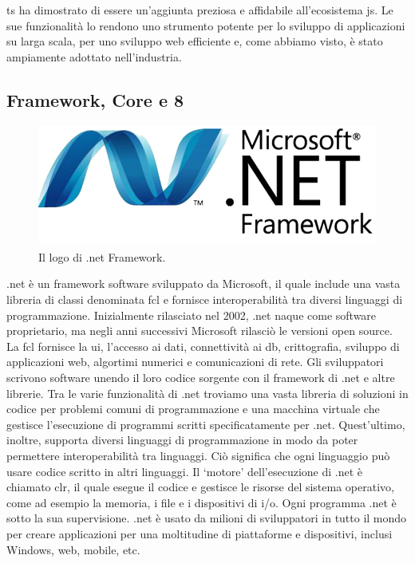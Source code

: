 \acrfull{ts} ha dimostrato di essere un'aggiunta preziosa e affidabile all'ecosistema \acrlong{js}. Le sue funzionalità lo rendono uno strumento potente per lo sviluppo di applicazioni su larga scala, per uno sviluppo web efficiente e, come abbiamo visto, è stato ampiamente adottato nell'industria.


\newpage
\subsection{ Framework,  Core e  8}\label{sec:.net} 
\begin{figure}[H]
\centering
\includegraphics[width=.7\textwidth]{Images/net.png}
\caption{\label{fig:.net}Il logo di \gls{.net} Framework.}
\end{figure}
\gls{.net} è un \gls{framework} \gls{software} sviluppato da Microsoft, il quale include una vasta libreria di classi denominata \acrfull{fcl} e fornisce interoperabilità tra diversi linguaggi di programmazione.
Inizialmente rilasciato nel 2002, \gls{.net} naque come software proprietario, ma negli anni successivi Microsoft rilasciò le versioni \gls{open source}.
La \acrshort{fcl} fornisce la \acrshort{ui}, l'accesso ai dati, connettività ai \acrshort{db}, crittografia, sviluppo di applicazioni web, algortimi numerici e comunicazioni di rete. Gli sviluppatori scrivono \gls{software} unendo il loro codice sorgente con il \gls{framework} di \gls{.net} e altre librerie.
Tra le varie funzionalità di \gls{.net} troviamo una vasta libreria di soluzioni in codice per problemi comuni di programmazione e una macchina virtuale che gestisce l'esecuzione di programmi scritti specificatamente per \gls{.net}. Quest'ultimo, inoltre, supporta diversi linguaggi di programmazione in modo da poter permettere interoperabilità tra linguaggi. Ciò significa che ogni linguaggio può usare codice scritto in altri linguaggi.
Il `motore' dell'esecuzione di \gls{.net} è chiamato \acrfull{clr}, il quale esegue il codice e gestisce le risorse del sistema operativo, come ad esempio la memoria, i file e i dispositivi di \acrshort{i/o}. Ogni programma \gls{.net} è sotto la sua supervisione.
\gls{.net} è usato da milioni di sviluppatori in tutto il mondo per creare applicazioni per una moltitudine di piattaforme e dispositivi, inclusi Windows, web, mobile, etc.\newline

